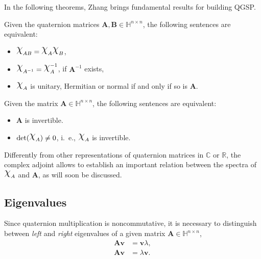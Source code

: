 In the following theorems, Zhang brings fundamental results for building QGSP.

\begin{theorem}
    \label{th:equiv01}
    Given the quaternion matrices $ \mathbf{A}, \mathbf{B} \in \mathbb{H}^{n \times n} $, the following sentences are equivalent:

    \begin{itemize}[noitemsep]
        \item $ \rchi_{AB} = \rchi_{A} \rchi_{B} $,
        \item $ \rchi_{A^{-1}} = \rchi_{A}^{-1}$, if $ \mathbf{A}^{-1} $ exists,
        \item $ \rchi_{A}$ is unitary, Hermitian or normal if and only if so is $ \mathbf{A} $.
    \end{itemize}

\end{theorem}

\begin{theorem}
    \label{th:equiv02}
    Given the matrix $ \mathbf{A} \in \mathbb{H}^{n \times n} $, the following sentences are equivalent:

    \begin{itemize}[noitemsep]
        \item $\mathbf{A}$ is invertible.
        \item $\mathrm{det}(\rchi_A) \neq 0$, i.~e., $\rchi_{A}$ is invertible.
    \end{itemize}

\end{theorem}

Differently from other representations of quaternion matrices in $ \mathbb{C} $ or $ \mathbb{R} $, the complex adjoint allows to establish an important relation between the spectra of $ \rchi_{A} $ and $ \mathbf{A} $, as will soon be discussed.

\subsection{Eigenvalues}
Since quaternion multiplication is noncommutative, it is necessary to distinguish between \textit{left} and \textit{right} eigenvalues of a given matrix $ \mathbf{A} \in \mathbb{H}^{n \times n} $,
\begin{align*}
    \mathbf{A} \mathbf{v} & = \mathbf{v} \lambda, \tag{right} \\
    \mathbf{A} \mathbf{v} & = \lambda \mathbf{v}.  \tag{left}
\end{align*}

